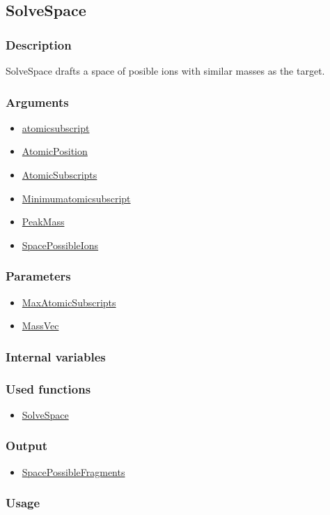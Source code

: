 \subsection{SolveSpace}\label{SolveSpace}
\subsubsection{Description}
SolveSpace drafts a space of posible ions with similar masses as the target.
\subsubsection{Arguments}
\begin{itemize}
\item \hyperref[atomicsubscript]{atomicsubscript}
\item \hyperref[AtomicPosition]{AtomicPosition}
\item \hyperref[AtomicSubscripts]{AtomicSubscripts}
\item \hyperref[Minimumatomicsubscript]{Minimumatomicsubscript}
\item \hyperref[PeakMass]{PeakMass}
\item \hyperref[SpacePossibleIons]{SpacePossibleIons}
\end{itemize}
\subsubsection{Parameters}
\begin{itemize}
\item \hyperref[MaxAtomicSubscripts]{MaxAtomicSubscripts}
\item \hyperref[MassVec]{MassVec}
\end{itemize}
\subsubsection{Internal variables}
\subsubsection{Used functions}
\begin{itemize}
\item \hyperref[SolveSpace]{SolveSpace}
\end{itemize}
\subsubsection{Output}
\begin{itemize}
\item \hyperref[SpacePossibleFragments]{SpacePossibleFragments}
\end{itemize}
\subsubsection{Usage}


